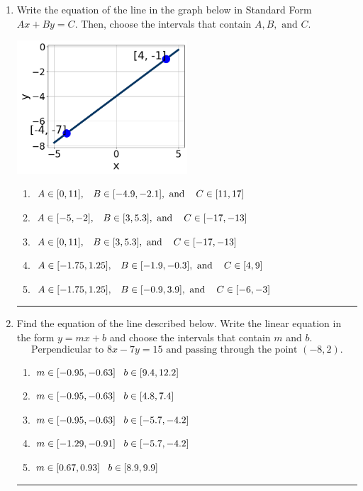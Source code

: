 \documentclass[14pt]{extbook}
\newcommand{\litem}[1]{\item#1\hspace*{-1cm}\rule{\textwidth}{0.4pt}}
\begin{document}
\begin{enumerate}
{\begin{enumerate}[label=\Alph*.]
\end{enumerate} }
\litem{
Write the equation of the line in the graph below in Standard Form $Ax+By=C$. Then, choose the intervals that contain $A, B, \text{ and } C$.
\begin{center}
    \includegraphics[width=0.5\textwidth]{../Figures/linearGraphToStandardCopyB.png}
\end{center}
\begin{enumerate}[label=\Alph*.]
\item \( A \in [0, 11], \hspace{3mm} B \in [-4.9, -2.1], \text{ and } \hspace{3mm} C \in [11, 17] \)
\item \( A \in [-5, -2], \hspace{3mm} B \in [3, 5.3], \text{ and } \hspace{3mm} C \in [-17, -13] \)
\item \( A \in [0, 11], \hspace{3mm} B \in [3, 5.3], \text{ and } \hspace{3mm} C \in [-17, -13] \)
\item \( A \in [-1.75, 1.25], \hspace{3mm} B \in [-1.9, -0.3], \text{ and } \hspace{3mm} C \in [4, 9] \)
\item \( A \in [-1.75, 1.25], \hspace{3mm} B \in [-0.9, 3.9], \text{ and } \hspace{3mm} C \in [-6, -3] \)

\end{enumerate} }
\litem{
Find the equation of the line described below. Write the linear equation in the form $ y=mx+b $ and choose the intervals that contain $m$ and $b$.\[ \text{Perpendicular to } 8 x - 7 y = 15 \text{ and passing through the point } (-8, 2). \]\begin{enumerate}[label=\Alph*.]
\item \( m \in [-0.95, -0.63] \hspace*{3mm} b \in [9.4, 12.2] \)
\item \( m \in [-0.95, -0.63] \hspace*{3mm} b \in [4.8, 7.4] \)
\item \( m \in [-0.95, -0.63] \hspace*{3mm} b \in [-5.7, -4.2] \)
\item \( m \in [-1.29, -0.91] \hspace*{3mm} b \in [-5.7, -4.2] \)
\item \( m \in [0.67, 0.93] \hspace*{3mm} b \in [8.9, 9.9] \)


\end{enumerate}}
\end{enumerate}
\end{document}
